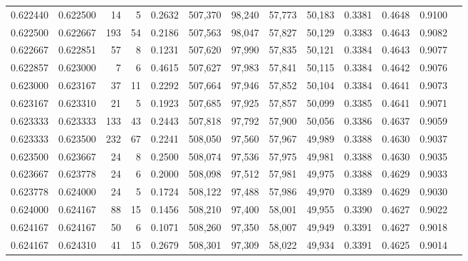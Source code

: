 \begin{tabular}{rrrrrrrrrrrrr}
0.622440 & 0.622500 &    14 &   5 &                                     0.2632 & 507,370 &  98,240 &  57,773 &  50,183 & 0.3381 & 0.4648 & 0.9100 \\
0.622500 & 0.622667 &   193 &  54 &                                     0.2186 & 507,563 &  98,047 &  57,827 &  50,129 & 0.3383 & 0.4643 & 0.9082 \\
0.622667 & 0.622851 &    57 &   8 &                                     0.1231 & 507,620 &  97,990 &  57,835 &  50,121 & 0.3384 & 0.4643 & 0.9077 \\
0.622857 & 0.623000 &     7 &   6 &                                     0.4615 & 507,627 &  97,983 &  57,841 &  50,115 & 0.3384 & 0.4642 & 0.9076 \\
0.623000 & 0.623167 &    37 &  11 &                                     0.2292 & 507,664 &  97,946 &  57,852 &  50,104 & 0.3384 & 0.4641 & 0.9073 \\
0.623167 & 0.623310 &    21 &   5 &                                     0.1923 & 507,685 &  97,925 &  57,857 &  50,099 & 0.3385 & 0.4641 & 0.9071 \\
0.623333 & 0.623333 &   133 &  43 &                                     0.2443 & 507,818 &  97,792 &  57,900 &  50,056 & 0.3386 & 0.4637 & 0.9059 \\
0.623333 & 0.623500 &   232 &  67 &                                     0.2241 & 508,050 &  97,560 &  57,967 &  49,989 & 0.3388 & 0.4630 & 0.9037 \\
0.623500 & 0.623667 &    24 &   8 &                                     0.2500 & 508,074 &  97,536 &  57,975 &  49,981 & 0.3388 & 0.4630 & 0.9035 \\
0.623667 & 0.623778 &    24 &   6 &                                     0.2000 & 508,098 &  97,512 &  57,981 &  49,975 & 0.3388 & 0.4629 & 0.9033 \\
0.623778 & 0.624000 &    24 &   5 &                                     0.1724 & 508,122 &  97,488 &  57,986 &  49,970 & 0.3389 & 0.4629 & 0.9030 \\
0.624000 & 0.624167 &    88 &  15 &                                     0.1456 & 508,210 &  97,400 &  58,001 &  49,955 & 0.3390 & 0.4627 & 0.9022 \\
0.624167 & 0.624167 &    50 &   6 &                                     0.1071 & 508,260 &  97,350 &  58,007 &  49,949 & 0.3391 & 0.4627 & 0.9018 \\
0.624167 & 0.624310 &    41 &  15 &                                     0.2679 & 508,301 &  97,309 &  58,022 &  49,934 & 0.3391 & 0.4625 & 0.9014 \\

\end{tabular}
